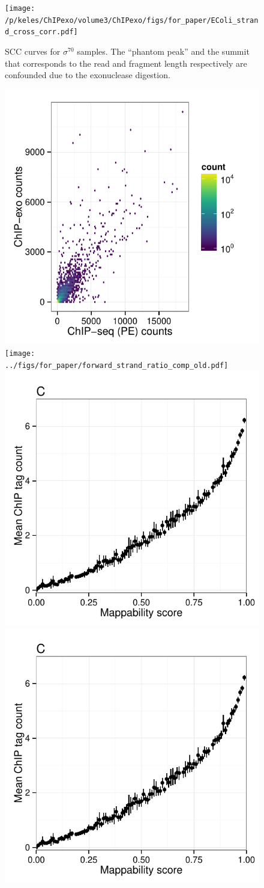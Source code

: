 \documentclass{bmcart}\usepackage[]{graphicx}\usepackage[]{color}
\newcommand{\sig}{\sigma^{70}}
\begin{document}
\begin{figure}[h!]
\centering
\texttt{[image: /p/keles/ChIPexo/volume3/ChIPexo/figs/for\_paper/EColi\_strand\_cross\_corr.pdf]}
\caption{SCC curves for $\sig$ samples. The ``phantom peak'' and the
  summit that corresponds to the read and fragment length respectively
  are confounded due to the exonuclease digestion.}
  \label{fig:scc_exo}
\end{figure}

\newpage

\begin{figure}[h!]
  \centering
  \includegraphics[width = .46\textwidth,page = 3 ]{../figs/for_paper/ChIPseqPET_ChIPexo_tagCount_comparison.pdf}
  \texttt{[image: ../figs/for\_paper/forward\_strand\_ratio\_comp\_old.pdf]}
\includegraphics[width = .46\textwidth,page = 1]{../figs/for_paper/eukaryotic_bias_CTCF.pdf}
  \includegraphics[width = .46\textwidth,page = 2]{../figs/for_paper/eukaryotic_bias_CTCF.pdf}

\end{figure}
\end{document}

